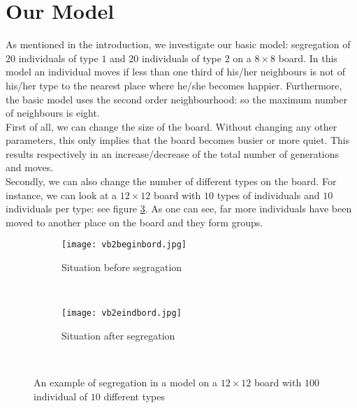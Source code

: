 \section{Our Model}

As mentioned in the introduction, we investigate our basic model: segregation of $20$ individuals of type $1$ and $20$ individuals of type $2$ on a $8 \times 8$ board.
In this model an individual moves if less than one third of his/her neighbours is not of his/her type to the nearest place where he/she becomes happier.
Furthermore, the basic model uses the second order neighbourhood: so the maximum number of neighbours is eight.\\

First of all, we can change the size of the board.
Without changing any other parameters, this only implies that the board becomes busier or more quiet.
This results respectively in an increase/decrease of the total number of generations and moves.\\

Secondly, we can also change the number of different types on the board.
For instance, we can look at a $12\times 12$ board with $10$ types of individuals and $10$ individuals per type: see figure \ref{fig:example big board}.
As one can see, far more individuals have been moved to another place on the board and they form groups.

\begin{figure}[H]
	\centering
    \begin{subfigure}{0.45\textwidth}
        \texttt{[image: vb2beginbord.jpg]}
        \caption{Situation before segragation}
        \label{fig:example big board begin}
    \end{subfigure}\hspace{0cm}
    ~ %
    \begin{subfigure}{0.45\textwidth}
        \texttt{[image: vb2eindbord.jpg]}
        \caption{Situation after segregation}
        \label{fig:example big board end}
    \end{subfigure}
    ~ %
    \caption{An example of segregation in a model on a $12\times 12$ board with $100$ individual of $10$ different types}
    \label{fig:example big board}
\end{figure}




